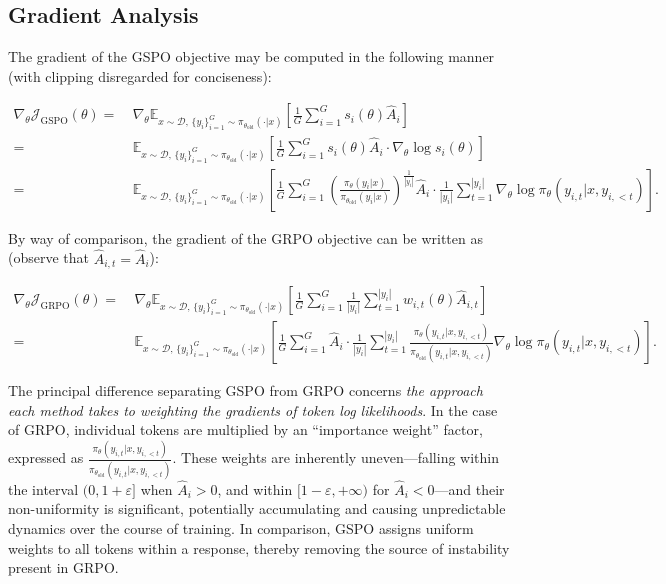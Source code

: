 \subsection{Gradient Analysis}
\label{subsec:gradient}

The gradient of the GSPO objective may be computed in the following manner (with clipping disregarded for conciseness):

\begin{align}
\nabla_{\theta} \mathcal{J}_\text{GSPO} (\theta)
=&\ 
\nabla_{\theta} \mathbb{E}_{ x \sim \mathcal{D},\, \{y_i\}_{i=1}^G \sim \pi_{\theta_\text{old}}( \cdot | x) }
\left[ 
\frac{1}{G} \sum_{i=1}^{G} s_{i}(\theta) \widehat{A}_{i}
\right] \\
= &\ 
\mathbb{E}_{ x \sim \mathcal{D},\, \{y_i\}_{i=1}^G \sim \pi_{\theta_\text{old}}( \cdot | x) }
\left[ 
\frac{1}{G} \sum_{i=1}^{G}
s_{i}(\theta) \widehat{A}_{i}
\cdot \nabla_{\theta} \log s_{i}(\theta)
\right] \\
=&\ 
\mathbb{E}_{ x \sim \mathcal{D},\, \{y_i\}_{i=1}^G \sim \pi_{\theta_\text{old}}( \cdot | x) }
\left[ 
\frac{1}{G} \sum_{i=1}^{G} 
\left( \frac{ \pi_{\theta} (y_i | x) }{ \pi_{\theta_\text{old}} (y_i | x)} \right)^{\frac{1}{|y_i|}} \widehat{A}_{i} 
\cdot \frac{1}{|y_i|} \sum_{t=1}^{|y_i|} \nabla_{\theta} \log \pi_{\theta} (y_{i,t} | x, y_{i,<t}) 
\right].
\label{equ:gspo_grad}
\end{align}

By way of comparison, the gradient of the GRPO objective can be written as (observe that $\widehat{A}_{i,t} = \widehat{A}_{i}$):

\begin{align}
\nabla_{\theta} \mathcal{J}_\text{GRPO} (\theta) 
=&\ 
\nabla_{\theta} \mathbb{E}_{ x \sim \mathcal{D},\, \{y_i\}_{i=1}^G \sim \pi_{\theta_\text{old}}( \cdot | x) }
\left[ \frac{1}{G} \sum_{i=1}^{G} \frac{1}{|y_i|} \sum_{t=1}^{|y_i|} 
w_{i,t}(\theta) \widehat{A}_{i,t}
\right] \\
=&\
\mathbb{E}_{ x \sim \mathcal{D},\, \{y_i\}_{i=1}^G \sim \pi_{\theta_\text{old}}( \cdot | x) }
\left[ \frac{1}{G} \sum_{i=1}^{G} \widehat{A}_{i} 
\cdot \frac{1}{|y_i|} \sum_{t=1}^{|y_i|} 
\frac{ \pi_{\theta} (y_{i,t} | x, y_{i,<t}) }{ \pi_{\theta_\text{old}} (y_{i,t} | x,y_{i,<t})} 
\nabla_{\theta} \log \pi_{\theta} (y_{i,t} | x, y_{i,<t})  
\right].
\end{align}

The principal difference separating GSPO from GRPO concerns \textit{the approach each method takes to weighting the gradients of token log likelihoods}. In the case of GRPO, individual tokens are multiplied by an ``importance weight'' factor, expressed as $\frac{ \pi_{\theta} (y_{i,t} | x, y_{i,<t}) }{ \pi_{\theta_\text{old}} (y_{i,t} | x,y_{i,<t})}$. These weights are inherently uneven—falling within the interval $(0, 1+\varepsilon]$ when $\widehat{A}_{i} > 0$, and within $[1-\varepsilon, +\infty)$ for $\widehat{A}_{i} < 0$—and their non-uniformity is significant, potentially accumulating and causing unpredictable dynamics over the course of training. In comparison, GSPO assigns uniform weights to all tokens within a response, thereby removing the source of instability present in GRPO.

